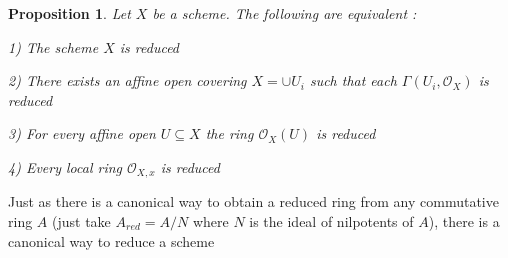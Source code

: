 \documentclass{article}
\newtheorem{proposition}[theorem]{Proposition}
\begin{document}
\begin{proposition}
    Let $X$ be a scheme. The following are equivalent :

1) The scheme $X$ is reduced

2) There exists an affine open covering $X=\cup U_i$ such that each $\Gamma (U_i, \mathcal O_X)$ is reduced

3) For every affine open $U \subseteq X$ the ring $\mathcal O_X(U)$ is reduced

4) Every local ring $\mathcal O_{X,x}$ is reduced
\end{proposition}

Just as there is a canonical way to obtain a reduced ring from any commutative ring $A$ (just take $A_{r e d}=A/N$ where $N$ is the ideal of nilpotents of $A$),  there is a canonical way to reduce a scheme 
\end{document}
